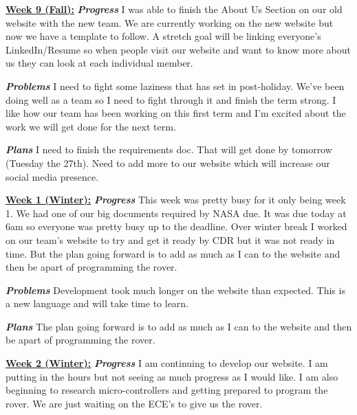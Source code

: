 \documentclass[onecolumn, draftclsnofoot, 10pt, compsoc]{IEEEtran}
\begin{document}
\underline{\textbf{Week 9 (Fall):}}
\newline\textbf{\textit{{Progress}}}
\newline  I was able to finish the About Us Section on our old website with the new team. We are currently working on the new website but now we have a template to follow. A stretch goal will be linking everyone's LinkedIn/Resume so when people visit our website and want to know more about us they can look at each individual member. \newline 

\textbf{\textit{{Problems}}}
\newline I need to fight some laziness that has set in post-holiday. We've been doing well as a team so I need to fight through it and finish the term strong. I like how our team has been working on this first term and I'm excited about the work we will get done for the next term. \newline 

\textbf{\textit{{Plans}}}
\newline I need to finish the requirements doc. That will get done by tomorrow (Tuesday the 27th). Need to add more to our website which will increase our social media presence. \newline 

\underline{\textbf{Week 1 (Winter):}}
\newline\textbf{\textit{{Progress}}}
\newline This week was pretty busy for it only being week 1. We had one of our big documents required by NASA due. It was due today at 6am so everyone was pretty busy up to the deadline. Over winter break I worked on our team's website to try and get it ready by CDR but it was not ready in time.  But the plan going forward is to add as much as I can to the website and then be apart of programming the rover. \newline 

\textbf{\textit{{Problems}}}
\newline Development took much longer on the website than expected. This is a new language and will take time to learn. \newline 

\textbf{\textit{{Plans}}}
\newline The plan going forward is to add as much as I can to the website and then be apart of programming the rover. \newline 

\underline{\textbf{Week 2 (Winter):}}
\newline\textbf{\textit{{Progress}}}
\newline I am continuing to develop our website. I am putting in the hours but not seeing as much progress as I would like. I am also beginning to research micro-controllers and getting prepared to program the rover. We are just waiting on the ECE's to give us the rover. \newline 
\end{document}
